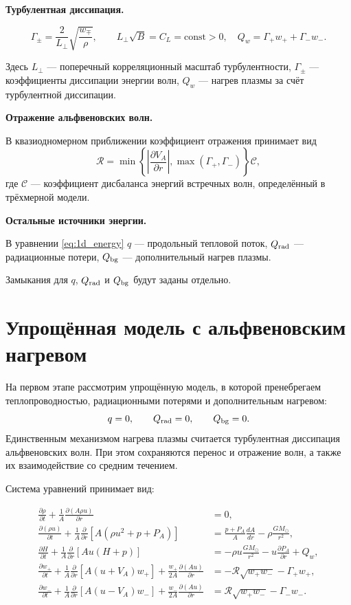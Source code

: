 \documentclass[12pt,a4paper]{article}
\newcommand{\PA}{P_A}
\newcommand{\Rref}{\mathcal R}
\begin{document}
\medskip
\noindent\textbf{Турбулентная диссипация.}

\[
\Gamma_\pm=\frac{2}{L_\perp}
\sqrt{\frac{w_\mp}{\rho}},
\qquad
L_\perp\sqrt{B}=C_L=\mathrm{const}>0, \quad Q_w=\Gamma_+w_++\Gamma_-w_-.
\]

Здесь $L_\perp$ --- поперечный корреляционный масштаб
турбулентности, $\Gamma_\pm$ --- коэффициенты
диссипации энергии волн, $Q_w$ --- нагрев плазмы
за счёт турбулентной диссипации.

\medskip
\noindent\textbf{Отражение альфвеновских волн.}

В квазиодномерном приближении коэффициент отражения
принимает вид
\[
\Rref=
\min\left\{
\left|\frac{\partial V_A}{\partial r}\right|,
\max(\Gamma_+,\Gamma_-)
\right\}\mathcal C,
\]
где $\mathcal C$ --- коэффициент дисбаланса энергий
встречных волн, определённый в трёхмерной модели.

\medskip
\noindent\textbf{Остальные источники энергии.}

В уравнении \eqref{eq:1d_energy}
$q$ --- продольный тепловой поток,
$Q_{\rm rad}$ --- радиационные потери,
$Q_{\rm bg}$ --- дополнительный нагрев плазмы.

Замыкания для $q$, $Q_{\rm rad}$ и $Q_{\rm bg}$
будут заданы отдельно.


\section{Упрощённая модель с альфвеновским нагревом}
\label{sec:simplified}

На первом этапе рассмотрим упрощённую модель,
в которой пренебрегаем теплопроводностью,
радиационными потерями и дополнительным нагревом:
\[
q=0,\qquad Q_{\rm rad}=0,\qquad Q_{\rm bg}=0.
\]
Единственным механизмом нагрева плазмы считается
турбулентная диссипация альфвеновских волн.
При этом сохраняются перенос и отражение волн,
а также их взаимодействие со средним течением.

Система уравнений принимает вид:

\begingroup
\small
\begin{align}
\frac{\partial\rho}{\partial t}
+\frac{1}{A}\frac{\partial(A\rho u)}{\partial r}
&=0,
\label{eq:s_mass}\\[5pt]
\frac{\partial(\rho u)}{\partial t}
+\frac{1}{A}\frac{\partial}{\partial r}
\left[A(\rho u^2+p+\PA)\right]
&=\frac{p+\PA}{A}\frac{dA}{dr}-\rho\frac{GM_\odot}{r^2},
\label{eq:s_momentum}\\[5pt]
\frac{\partial H}{\partial t}
+\frac{1}{A}\frac{\partial}{\partial r}
\left[Au(H+p)\right]
&=-\rho u\frac{GM_\odot}{r^2}
-u\frac{\partial\PA}{\partial r}+Q_w,
\label{eq:s_energy}\\[5pt]
\frac{\partial w_+}{\partial t}
+\frac{1}{A}\frac{\partial}{\partial r}
\left[A(u+V_A)w_+\right]
+\frac{w_+}{2A}\frac{\partial(Au)}{\partial r}
&=-\Rref\sqrt{w_+w_-}-\Gamma_+w_+,
\label{eq:s_wplus}\\[5pt]
\frac{\partial w_-}{\partial t}
+\frac{1}{A}\frac{\partial}{\partial r}
\left[A(u-V_A)w_-\right]
+\frac{w_-}{2A}\frac{\partial(Au)}{\partial r}
&=\Rref\sqrt{w_+w_-}-\Gamma_-w_-.
\label{eq:s_wminus}
\end{align}
\endgroup
\end{document}
